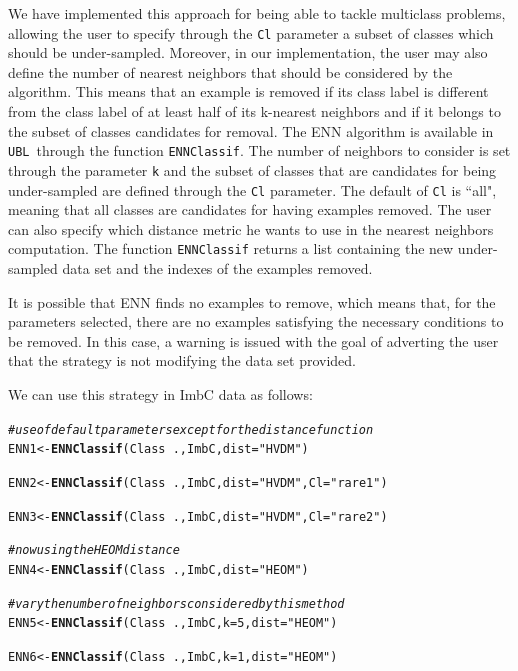 \documentclass[10pt,a4paper]{article}\usepackage[]{graphicx}\usepackage[]{color}
\makeatletter
\newcommand{\hlnum}[1]{\textcolor[rgb]{0.686,0.059,0.569}{#1}}%
\newcommand{\hlstr}[1]{\textcolor[rgb]{0.192,0.494,0.8}{#1}}%
\newcommand{\hlcom}[1]{\textcolor[rgb]{0.678,0.584,0.686}{\textit{#1}}}%
\newcommand{\hlopt}[1]{\textcolor[rgb]{0,0,0}{#1}}%
\newcommand{\hlstd}[1]{\textcolor[rgb]{0.345,0.345,0.345}{#1}}%
\newcommand{\hlkwb}[1]{\textcolor[rgb]{0.69,0.353,0.396}{#1}}%
\newcommand{\hlkwc}[1]{\textcolor[rgb]{0.333,0.667,0.333}{#1}}%
\newcommand{\hlkwd}[1]{\textcolor[rgb]{0.737,0.353,0.396}{\textbf{#1}}}%
\newenvironment{kframe}{%
 \def\at@end@of@kframe{}%
 \ifinner\ifhmode%
  \def\at@end@of@kframe{\end{minipage}}%
  \begin{minipage}{\columnwidth}%
 \fi\fi%
 \def\FrameCommand##1{\hskip\@totalleftmargin \hskip-\fboxsep
 \colorbox{shadecolor}{##1}\hskip-\fboxsep
     \hskip-\linewidth \hskip-\@totalleftmargin \hskip\columnwidth}%
 \MakeFramed {\advance\hsize-\width
   \@totalleftmargin\z@ \linewidth\hsize
   \@setminipage}}%
 {\par\unskip\endMakeFramed%
 \at@end@of@kframe}
\newenvironment{knitrout}{}{} %
\newcommand{\UBL}{\texttt{UBL}\ }
\makeatother
\begin{document}
We have implemented this approach for being able to tackle multiclass problems, allowing the user to specify through the \texttt{Cl} parameter a subset of classes which should be under-sampled. Moreover, in our implementation, the user may also define the number of nearest neighbors that should be considered by the algorithm. This means that an example is removed if its class label is different from the class label of at least half of its k-nearest neighbors and if it belongs to the subset of classes candidates for removal. The ENN algorithm is available in \UBL through the function \texttt{ENNClassif}. The number of neighbors to consider is set through the parameter \texttt{k} and the subset of classes that are candidates for being under-sampled are defined through the \texttt{Cl} parameter. The default of \texttt{Cl} is ``all", meaning that all classes are candidates for having examples removed. The user can also specify which distance metric he wants to use in the nearest neighbors computation. The function \texttt{ENNClassif} returns a list containing the new under-sampled data set and the indexes of the examples removed.

It is possible that ENN finds no examples to remove, which means that, for the parameters selected, there are no examples satisfying the necessary conditions to be removed. In this case, a warning is issued with the goal of adverting the user that the strategy is not modifying the data set provided.


We can use this strategy in ImbC data as follows:


\begin{knitrout}\footnotesize
{}\color{fgcolor}\begin{kframe}
\begin{alltt}
\hlcom{# use of default parameters except for the distance function}
\hlstd{ENN1} \hlkwb{<-} \hlkwd{ENNClassif}\hlstd{(Class}\hlopt{~}\hlstd{., ImbC,} \hlkwc{dist}\hlstd{=}\hlstr{"HVDM"}\hlstd{)}

\hlstd{ENN2} \hlkwb{<-} \hlkwd{ENNClassif}\hlstd{(Class}\hlopt{~}\hlstd{., ImbC,} \hlkwc{dist}\hlstd{=}\hlstr{"HVDM"}\hlstd{,} \hlkwc{Cl}\hlstd{=}\hlstr{"rare1"}\hlstd{)}

\hlstd{ENN3} \hlkwb{<-} \hlkwd{ENNClassif}\hlstd{(Class}\hlopt{~}\hlstd{., ImbC,} \hlkwc{dist}\hlstd{=}\hlstr{"HVDM"}\hlstd{,} \hlkwc{Cl}\hlstd{=}\hlstr{"rare2"}\hlstd{)}

\hlcom{# now using the HEOM distance}
\hlstd{ENN4} \hlkwb{<-} \hlkwd{ENNClassif}\hlstd{(Class}\hlopt{~}\hlstd{., ImbC,} \hlkwc{dist}\hlstd{=}\hlstr{"HEOM"}\hlstd{)}

\hlcom{# vary the number of neighbors considered by this method}
\hlstd{ENN5} \hlkwb{<-} \hlkwd{ENNClassif}\hlstd{(Class}\hlopt{~}\hlstd{., ImbC,} \hlkwc{k}\hlstd{=}\hlnum{5}\hlstd{,} \hlkwc{dist}\hlstd{=}\hlstr{"HEOM"}\hlstd{)}

\hlstd{ENN6} \hlkwb{<-} \hlkwd{ENNClassif}\hlstd{(Class}\hlopt{~}\hlstd{., ImbC,} \hlkwc{k}\hlstd{=}\hlnum{1}\hlstd{,} \hlkwc{dist}\hlstd{=}\hlstr{"HEOM"}\hlstd{)}
\end{alltt}
\end{kframe}
\end{knitrout}
\end{document}
